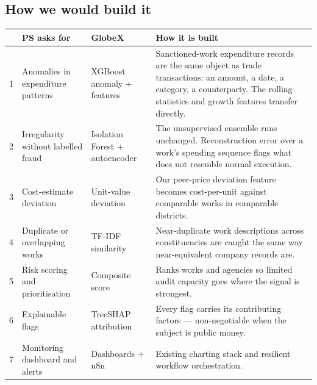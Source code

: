 \documentclass[11pt]{article}
\begin{document}
\subsection*{How we would build it}
\renewcommand{\arraystretch}{1.35}
\noindent\begin{longtable}{@{}p{0.5cm}p{4.5cm}p{2.0cm}p{8.6cm}@{}}
\toprule
& \textbf{PS asks for} & \textbf{GlobeX} & \textbf{How it is built} \\
\midrule
\endhead
1 & Anomalies in expenditure patterns & XGBoost anomaly + features & Sanctioned-work expenditure records are the same object as trade transactions: an amount, a date, a category, a counterparty. The rolling-statistics and growth features transfer directly. \\
2 & Irregularity without labelled fraud & Isolation Forest + autoencoder & The unsupervised ensemble runs unchanged. Reconstruction error over a work's spending sequence flags what does not resemble normal execution. \\
3 & Cost-estimate deviation & Unit-value deviation & Our peer-price deviation feature becomes cost-per-unit against comparable works in comparable districts. \\
4 & Duplicate or overlapping works & TF-IDF similarity & Near-duplicate work descriptions across constituencies are caught the same way near-equivalent company records are. \\
5 & Risk scoring and prioritisation & Composite score & Ranks works and agencies so limited audit capacity goes where the signal is strongest. \\
6 & Explainable flags & TreeSHAP attribution & Every flag carries its contributing factors --- non-negotiable when the subject is public money. \\
7 & Monitoring dashboard and alerts & Dashboards + n8n & Existing charting stack and resilient workflow orchestration. \\
\bottomrule
\end{longtable}
\end{document}
